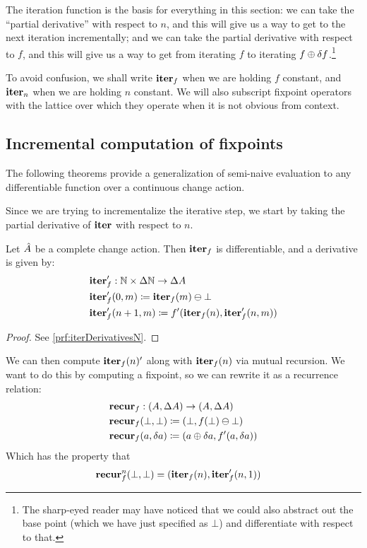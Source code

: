 The iteration function is the basis for everything in this section:
we can take the ``partial derivative'' with respect to $n$, and this will give us a way to get
to the next iteration incrementally; and we can take the partial derivative
with respect to $f$, and this will give us a way to get from iterating $f$ to iterating $f
\oplus \delta f$.\footnote{The sharp-eyed reader may have noticed that we
  could also abstract out the base point (which we have just specified as
  $\bot$) and differentiate with respect to that.}

To avoid confusion, we shall write $\mathbf{iter}_f$ when we are holding $f$ constant,
and $\mathbf{iter}_n$ when we are holding $n$ constant. We will also subscript fixpoint
operators with the lattice over which they operate when it is not obvious from context.

\subsection{Incremental computation of fixpoints}

The following theorems provide a
generalization of semi-naive evaluation to any differentiable function over a
continuous change action. 

Since we are trying to incrementalize the iterative step, we start by taking the partial
derivative of $\mathbf{iter}$ with respect to $n$.

\begin{prop}[name=Derivative of the iteration map with respect to $n$, restate=iterDerivativesN]
  \label{prop:iterDerivativesN}
  Let $\hat{A}$ be a complete change action. Then $\mathbf{iter}_f$ is differentiable, and a derivative is given by:
  \begin{align*}
    &\mathbf{iter}_f': \mathbb{N} \times \Delta \mathbb{N} \rightarrow \Delta A\\
    &\mathbf{iter}_f'(0, m) \coloneqq \mathbf{iter}_f(m) \ominus \bot\\
    &\mathbf{iter}_f'(n+1, m) \coloneqq f'(\mathbf{iter}_f(n), \mathbf{iter}_f'(n, m))
  \end{align*}
\end{prop}
\ifproofs
\begin{proof}
  See \cref{prf:iterDerivativesN}.
\end{proof}
\fi

We can then compute $\mathbf{iter}_f(n)'$ along with $\mathbf{iter}_f(n)$ via mutual recursion.
We want to do this by computing a fixpoint, so we can rewrite it as a recurrence
relation:
\begin{align*}
  &\mathbf{recur}_f : (A, \Delta A) \rightarrow (A, \Delta A)\\
  &\mathbf{recur}_f (\bot, \bot) \coloneqq (\bot, f(\bot) \ominus \bot)\\
  &\mathbf{recur}_f (a, \delta a) \coloneqq (a \oplus \delta a, f'(a, \delta a))
\end{align*}
Which has the property that
\begin{align*}
  &\mathbf{recur}_f^n (\bot, \bot) = (\mathbf{iter}_f(n), \mathbf{iter}_f'(n, 1))
\end{align*}

